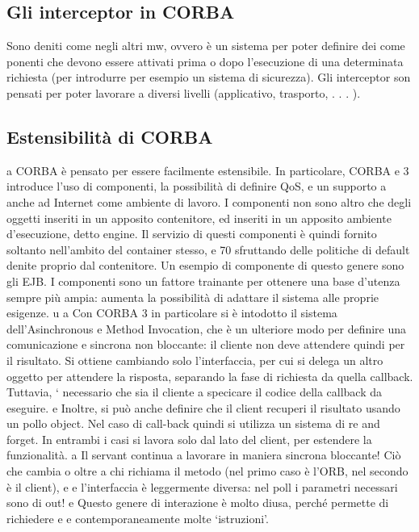 \subsection{Gli interceptor in CORBA}
Sono deniti come negli altri mw, ovvero è un sistema per poter definire dei come
ponenti che devono essere attivati prima o dopo l'esecuzione di una determinata
richiesta (per introdurre per esempio un sistema di sicurezza). Gli interceptor
son pensati per poter lavorare a diversi livelli (applicativo, trasporto, . . . ).
\subsection{Estensibilità di CORBA}
a
CORBA è pensato per essere facilmente estensibile. In particolare, CORBA
e
3 introduce l'uso di componenti, la possibilità di definire QoS, e un supporto
a
anche ad Internet come ambiente di lavoro.
I componenti non sono altro che degli oggetti inseriti in un apposito contenitore, ed inseriti in un apposito ambiente
d'esecuzione, detto engine. Il servizio
di questi componenti è quindi fornito soltanto nell'ambito del container stesso,
e
70
sfruttando delle politiche di default denite proprio dal contenitore. Un esempio
di componente di questo genere sono gli EJB.
I componenti sono un fattore trainante per ottenere una base d'utenza sempre più ampia: aumenta la possibilità di
adattare il sistema alle proprie esigenze.
u
a
Con CORBA 3 in particolare si è intodotto il sistema dell'Asinchronous
e
Method Invocation, che è un ulteriore modo per definire una comunicazione
e
sincrona non bloccante: il cliente non deve attendere quindi per il risultato.
Si ottiene cambiando solo l'interfaccia, per cui si delega un altro oggetto per
attendere la risposta, separando la fase di richiesta da quella callback. Tuttavia,
` necessario che sia il cliente a specicare il codice della callback da eseguire.
e
Inoltre, si può anche definire che il client recuperi il risultato usando un pollo
object. Nel caso di call-back quindi si utilizza un sistema di re and forget. In
entrambi i casi si lavora solo dal lato del client, per estendere la funzionalità.
a
Il servant continua a lavorare in maniera sincrona bloccante! Ciò che cambia
o
oltre a chi richiama il metodo (nel primo caso è l'ORB, nel secondo è il client),
e
e
l'interfaccia è leggermente diversa: nel poll i parametri necessari sono di out!
e
Questo genere di interazione è molto diusa, perché permette di richiedere
e
e
contemporaneamente molte {`}istruzioni'.
